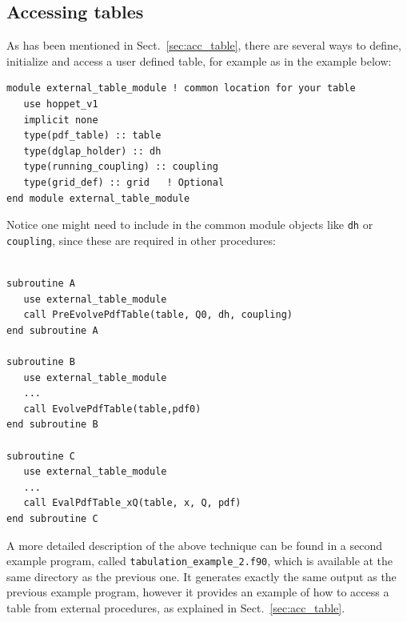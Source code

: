 \documentclass[12pt]{article}
\newcommand{\ttt}[1]{\texttt{#1}}
\begin{document}
\subsection{Accessing tables}

As has been mentioned in Sect.~\ref{sec:acc_table}, 
there are several ways to define, initialize
and access a user defined table, for example 
as in the example below:
\begin{lstlisting}
module external_table_module ! common location for your table
   use hoppet_v1
   implicit none
   type(pdf_table) :: table
   type(dglap_holder) :: dh
   type(running_coupling) :: coupling
   type(grid_def) :: grid   ! Optional
end module external_table_module
\end{lstlisting}
Notice one might need to include in the common module objects
like \texttt{dh} or \ttt{coupling}, since these are
required in other procedures:
\begin{lstlisting}

subroutine A
   use external_table_module
   call PreEvolvePdfTable(table, Q0, dh, coupling)
end subroutine A

subroutine B
   use external_table_module
   ...
   call EvolvePdfTable(table,pdf0)
end subroutine B

subroutine C
   use external_table_module
   ...
   call EvalPdfTable_xQ(table, x, Q, pdf)
end subroutine C

\end{lstlisting}

A more detailed description of the above technique 
can be found in a 
second example program, called \ttt{tabulation\_example\_2.f90},
which is available at the same directory as the
previous one. It generates exactly
the same output as the previous example program, however it
provides an example of how to access a table from
external procedures, as explained in Sect.~\ref{sec:acc_table}.




\end{document}
